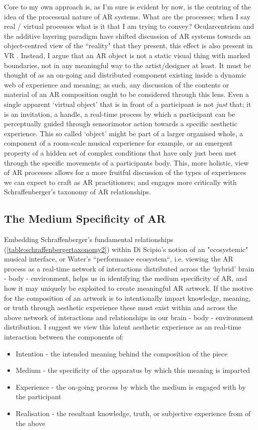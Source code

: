Core to my own approach is, as I'm sure is evident by now, is the centring of the idea of the processual nature of AR systems. What are the processes; when I say real / virtual processes what is it that I am trying to convey? Ocularcentrism and the additive layering paradigm have shifted discussion of AR systems towards an object-centred view of the ``reality" that they present, this effect is also present in VR \citep[]{hovhannisyan2019}. Instead, I argue that an AR object is not a static visual thing with marked boundaries, not in any meaningful way to the artist/designer at least. It must be thought of as an on-going and distributed component existing inside a dynamic web of experience and meaning; as such, any discussion of the contents or material of an AR composition ought to be considered through this lens. Even a single apparent `virtual object' that is in front of a participant is not \textit{just} that; it is an invitation, a handle, a real-time process by which a participant can be perceptually guided through sensorimotor action towards a specific aesthetic experience. This so called `object' might be part of a larger organised whole, a component of a room-scale musical experience for example, or an emergent property of a hidden set of complex conditions that have only just been met through the specific movements of a participants body. This, more holistic, view of AR processes allows for a more fruitful discussion of the types of experiences we can expect to craft as AR practitioners; and engages more critically with Schraffenberger's taxonomy of AR relationships.

\subsection{The Medium Specificity of AR}\label{sec: theory-materiality-mediumspec}
Embedding Schraffenberger's fundamental relationships (\autoref{table:schraffenbergertaxonomy2}) within Di Scipio's notion of an "ecosystemic" musical interface, or Water's ``performance ecosystem``, i.e. viewing the AR process as a real-time network of interactions distributed across the `hybrid' brain - body - environment, helps us in identifying the medium specificity of AR, and how it may uniquely be exploited to create meaningful AR artwork. If the motive for the composition of an artwork is to intentionally impart knowledge, meaning, or truth through aesthetic experience these must exist within and across the above network of interactions and relationships in our brain - body - environment distribution. I suggest we view this latent aesthetic experience as an real-time interaction between the components of:
\begin{itemize}
    \item Intention - the intended meaning behind the composition of the piece
    \item Medium - the specificity of the apparatus by which this meaning is imparted
    \item Experience - the on-going process by which the medium is engaged with by the participant
    \item Realisation - the resultant knowledge, truth, or subjective experience from of the above
\end{itemize}

